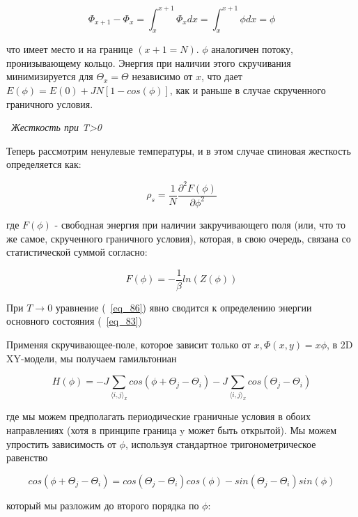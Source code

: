\documentclass[11pt]{article}
\begin{document}
\begin{equation}
\Phi_{x+1}-\Phi_x= \int_{x}^{x+1}\Phi_x dx = \int_{x}^{x+1}\phi dx = \phi
\label{eq_85}
\end{equation}

что имеет место и на границе $(x + 1 = N)$. $\phi$ аналогичен потоку, пронизывающему кольцо. Энергия при наличии этого скручивания минимизируется для $\Theta_x = \Theta$ независимо от $x$, что дает $E(\phi) = E(0) + JN [1 - cos (\phi)]$, как и раньше в случае скрученного граничного условия. 

~\emph{Жесткость при T>0}

Теперь рассмотрим ненулевые температуры, и в этом случае спиновая жесткость определяется как:

\begin{equation}
\rho_s=\frac{1}{N}\frac{\partial^2F(\phi)}{\partial \phi^2}
\label{eq_86}
\end{equation}

где $F (\phi)$ - свободная энергия при наличии закручивающего поля (или, что то же самое, скрученного граничного условия), которая, в свою очередь, связана со статистической суммой согласно:

\begin{equation}
F(\phi)=-\frac{1}{\beta}ln(Z(\phi))
\label{eq_87}
\end{equation}

При $T \to 0$ уравнение (~\ref{eq_86}) явно сводится к определению энергии основного состояния (~\ref{eq_83})

Применяя скручивающее-поле, которое зависит только от $x, \Phi(x, y) = x\phi$, в 2D XY-модели, мы получаем гамильтониан

\begin{equation}
H(\phi) = -J\sum\limits_{\langle i,j \rangle _x}cos(\phi + \Theta_j - \Theta_i) -J\sum\limits_{\langle i,j \rangle _x}cos(\Theta_j - \Theta_i)
\label{eq_88}
\end{equation}

где мы можем предполагать периодические граничные условия в обоих направлениях (хотя в принципе граница y может быть открытой). Мы можем упростить зависимость от $\phi$, используя стандартное тригонометрическое равенство

\begin{equation}
cos(\phi + \Theta_j - \Theta_i)=cos(\Theta_j - \Theta_i)cos(\phi)-sin(\Theta_j - \Theta_i)sin(\phi)
\label{eq_89}
\end{equation}

который мы разложим до второго порядка по $\phi$:
\end{document}
